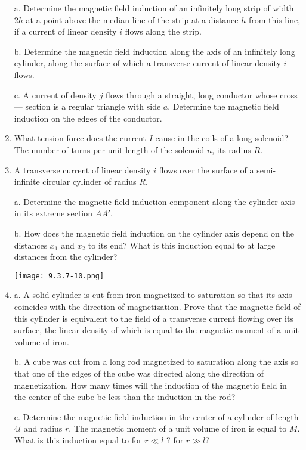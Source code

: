 \documentclass{article}
\begin{document}
\begin{enumerate}[label=9.3.\arabic*]
a. Determine the magnetic field induction of an infinitely long strip of width $2h$ at a point above the median line of the strip at a distance $h$ from this line, if a current of linear density $i$ flows along the strip. 

b. Determine the magnetic field induction along the axis of an infinitely long cylinder, along the surface of which a transverse current of linear density $i$ flows.

c. A current of density $j$ flows through a straight, long conductor whose cross — section is a regular triangle with side $a$. Determine the magnetic field induction on the edges of the conductor.

\item What tension force does the current $I$ cause in the coils of a long solenoid? The number of turns per unit length of the solenoid $n$, its radius $R$.

\item A transverse current of linear density $i$ flows over the surface of a semi-infinite circular cylinder of radius $R$.

a. Determine the magnetic field induction component along the cylinder axis in its extreme section $AA'$.

b. How does the magnetic field induction on the cylinder axis depend on the distances $x_1$ and $x_2$ to its end? What is this induction equal to at large distances from the cylinder?

\begin{center}
    \texttt{[image: 9.3.7-10.png]}
\end{center}

\item a. A solid cylinder is cut from iron magnetized to saturation so that its axis coincides with the direction of magnetization. Prove that the magnetic field of this cylinder is equivalent to the field of a transverse current flowing over its surface, the linear density of which is equal to the magnetic moment of a unit volume of iron. 

b. A cube was cut from a long rod magnetized to saturation along the axis so that one of the edges of the cube was directed along the direction of magnetization. How many times will the induction of the magnetic field in the center of the cube be less than the induction in the rod? 

c. Determine the magnetic field induction in the center of a cylinder of length $4l$ and radius $r$. The magnetic moment of a unit volume of iron is equal to $M$. What is this induction equal to for $r \ll l$ ? for $r \gg l$?


\end{enumerate}
\end{document}
